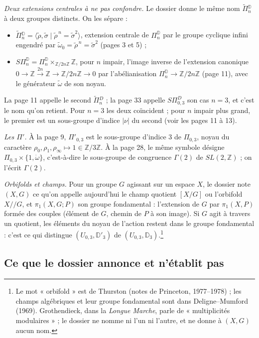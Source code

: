 \documentclass[11pt,a4paper]{article}
\begin{document}
\emph{Deux extensions centrales à ne pas confondre.} Le dossier donne le même nom
$\widetilde{\Pi}{}^{\mathbb{D}}_n$ à deux groupes distincts. On les sépare :
\begin{itemize}
\item $\widetilde{\Pi}{}^{\mathbb{D}}_n = \langle \tilde\rho, \tilde\sigma \mid
\tilde\rho^{\,n} = \tilde\sigma^2 \rangle$, extension centrale de
$\Pi^{\mathbb{D}}_n$ par le groupe cyclique infini engendré par
$\tilde\omega_0 = \tilde\rho^{\,n} = \tilde\sigma^2$ (pages 3 et 5) ;
\item $S\Pi^{\mathbb{D}}_n = \Pi^{\mathbb{D}}_n \times_{\mathbb{Z}/2n\mathbb{Z}}
\mathbb{Z}$, pour $n$ impair, l'image inverse de l'extension canonique
$0 \to \mathbb{Z} \xrightarrow{2n} \mathbb{Z} \to \mathbb{Z}/2n\mathbb{Z} \to 0$ par
l'abélianisation $\Pi^{\mathbb{D}}_n \to \mathbb{Z}/2n\mathbb{Z}$ (page 11), avec
le générateur $\tilde\omega$ de son noyau.
\end{itemize}
La page 11 appelle le second $\widetilde{\Pi}{}^{D}_n$ ; la page 33 appelle
$S\Pi^{D}_{0,3}$ son cas $n = 3$, et c'est le nom qu'on retient. Pour $n = 3$ les
deux coïncident ; pour $n$ impair plus grand, le premier est un sous-groupe
d'indice $|\nu|$ du second (voir les pages 11 à 13).

\emph{Les $\Pi'$.} À la page 9, $\Pi'_{0,3}$ est le sous-groupe d'indice $3$ de
$\Pi_{0,3}$, noyau du caractère $\rho_0, \rho_1, \rho_\infty \mapsto 1 \in
\mathbb{Z}/3\mathbb{Z}$. À la page 28, le même symbole désigne
$\Pi_{0,3} \times \{1, \dot\omega\}$, c'est-à-dire le sous-groupe de congruence
$\Gamma(2)$ de $SL(2, \mathbb{Z})$ ; on l'écrit $\Gamma(2)$.

\emph{Orbifolds et champs.} Pour un groupe $G$ agissant sur un espace $X$, le
dossier note $(X, G)$ ce qu'on appelle aujourd'hui le champ quotient $[X/G]$ ou
l'orbifold $X/\!/G$, et $\pi_1(X, G; P)$ son groupe fondamental : l'extension de
$G$ par $\pi_1(X, P)$ formée des couples (élément de $G$, chemin de $P$ à son
image). Si $G$ agit à travers un quotient, les éléments du noyau de l'action
restent dans le groupe fondamental : c'est ce qui distingue $(U_{0,3},
\mathbb{D}'_3)$ de $(U_{0,3}, \mathbb{D}_3)$.\footnote{Le mot « orbifold » est
de Thurston (notes de Princeton, 1977--1978) ; les champs algébriques et leur
groupe fondamental sont dans Deligne--Mumford (1969). Grothendieck, dans la
\emph{Longue Marche}, parle de « multiplicités modulaires » ; le dossier ne
nomme ni l'un ni l'autre, et ne donne à $(X, G)$ aucun nom.}

\subsection*{Ce que le dossier annonce et n'établit pas}
\end{document}
